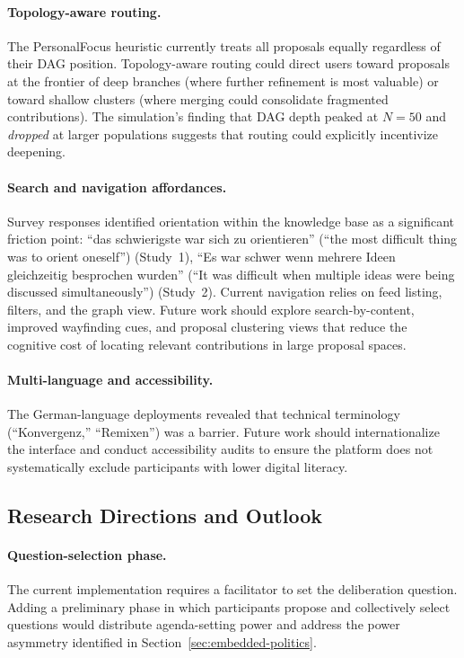 \documentclass[a4paper, 12pt, twoside]{iviathesis}
\begin{document}
\paragraph{Topology-aware routing.}
The PersonalFocus heuristic currently treats all proposals equally regardless of their DAG position. Topology-aware routing could direct users toward proposals at the frontier of deep branches (where further refinement is most valuable) or toward shallow clusters (where merging could consolidate fragmented contributions). The simulation's finding that DAG depth peaked at $N=50$ and \textit{dropped} at larger populations suggests that routing could explicitly incentivize deepening.

\paragraph{Search and navigation affordances.}
Survey responses identified orientation within the knowledge base as a significant friction point: ``das schwierigste war sich zu orientieren'' (``the most difficult thing was to orient oneself'') (Study~1), ``Es war schwer wenn mehrere Ideen gleichzeitig besprochen wurden'' (``It was difficult when multiple ideas were being discussed simultaneously'') (Study~2). Current navigation relies on feed listing, filters, and the graph view. Future work should explore search-by-content, improved wayfinding cues, and proposal clustering views that reduce the cognitive cost of locating relevant contributions in large proposal spaces.

\paragraph{Multi-language and accessibility.}
The German-language deployments revealed that technical terminology (``Konvergenz,'' ``Remixen'') was a barrier. Future work should internationalize the interface and conduct accessibility audits to ensure the platform does not systematically exclude participants with lower digital literacy.

\subsection{Research Directions and Outlook}

\paragraph{Question-selection phase.}
The current implementation requires a facilitator to set the deliberation question. Adding a preliminary phase in which participants propose and collectively select questions would distribute agenda-setting power and address the power asymmetry identified in Section~\ref{sec:embedded-politics}.
\end{document}
